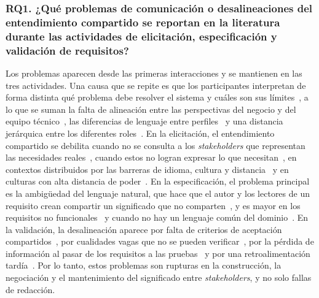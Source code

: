 \documentclass[12pt,letterpaper,oneside]{report}
\begin{document}
\subsubsection{RQ1. ¿Qué problemas de comunicación o desalineaciones del
entendimiento compartido se reportan en la literatura durante las actividades de
elicitación, especificación y validación de requisitos?}
Los problemas aparecen desde las primeras interacciones y se mantienen en las
tres actividades. Una causa que se repite es que los participantes interpretan
de forma distinta qué problema debe resolver el sistema y cuáles son sus
límites~\cite{balasubramaniam2023}, a lo que se suman la falta de alineación entre 
las perspectivas del negocio y del equipo técnico~\cite{irshad2021bdd}, las diferencias de
lenguaje entre perfiles~\cite{burkhardt2015} y una distancia jerárquica entre los diferentes roles~\cite{fuller2021blurring}. En la elicitación, el entendimiento compartido se debilita
cuando no se consulta a los \textit{stakeholders} que representan las
necesidades reales~\cite{khan2022stakeholders}, cuando estos no logran
expresar lo que necesitan~\cite{laporte2023}, en contextos distribuidos por las
barreras de idioma, cultura y distancia~\cite{calefato2015,khan2021,akbar2021}
y en culturas con alta distancia de poder~\cite{alsanoosy2019power}. En la
especificación, el problema principal es la ambigüedad del lenguaje natural,
que hace que el autor y los lectores de un requisito crean compartir un
significado que no comparten~\cite{ribeiro2020}, y es mayor en los requisitos no funcionales~\cite{behutiye2022quality} y cuando no hay un lenguaje
común del dominio~\cite{antonelli2016}. En la validación, la desalineación
aparece por falta de criterios de aceptación compartidos~\cite{kunz2016}, por
cualidades vagas que no se pueden verificar~\cite{laporte2023}, por la pérdida
de información al pasar de los requisitos a las
pruebas~\cite{irshad2021bdd} y por una retroalimentación
tardía~\cite{kasauli2021}. Por lo tanto, estos problemas son rupturas en la
construcción, la negociación y el mantenimiento del significado entre
\textit{stakeholders}, y no solo fallas de redacción.
\end{document}
